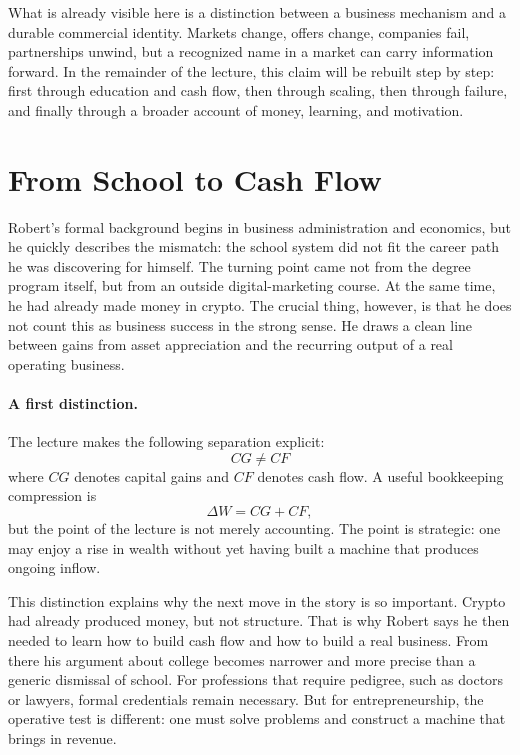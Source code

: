 What is already visible here is a distinction between a business mechanism and a durable commercial identity. Markets change, offers change, companies fail, partnerships unwind, but a recognized name in a market can carry information forward. In the remainder of the lecture, this claim will be rebuilt step by step: first through education and cash flow, then through scaling, then through failure, and finally through a broader account of money, learning, and motivation.

\section{From School to Cash Flow}

Robert's formal background begins in business administration and economics, but he quickly describes the mismatch: the school system did not fit the career path he was discovering for himself. The turning point came not from the degree program itself, but from an outside digital-marketing course. At the same time, he had already made money in crypto. The crucial thing, however, is that he does not count this as business success in the strong sense. He draws a clean line between gains from asset appreciation and the recurring output of a real operating business.

\paragraph{A first distinction.}
The lecture makes the following separation explicit:
\begin{equation}
CG \neq CF
\end{equation}
where \(CG\) denotes capital gains and \(CF\) denotes cash flow. A useful bookkeeping compression is
\begin{equation}
\Delta W = CG + CF,
\end{equation}
but the point of the lecture is not merely accounting. The point is strategic: one may enjoy a rise in wealth without yet having built a machine that produces ongoing inflow.

This distinction explains why the next move in the story is so important. Crypto had already produced money, but not structure. That is why Robert says he then needed to learn how to build cash flow and how to build a real business. From there his argument about college becomes narrower and more precise than a generic dismissal of school. For professions that require pedigree, such as doctors or lawyers, formal credentials remain necessary. But for entrepreneurship, the operative test is different: one must solve problems and construct a machine that brings in revenue.

